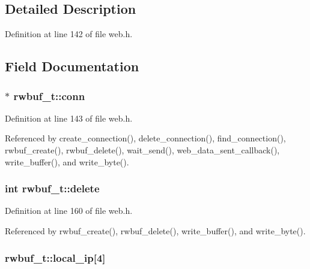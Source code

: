 \subsection{Detailed Description}


Definition at line 142 of file web.\+h.



\subsection{Field Documentation}
\subsubsection[{\texorpdfstring{conn}{conn}}]{$\ast$ rwbuf\+\_\+t\+::conn}\hypertarget{structrwbuf__t_a15785240e32c27f7af7c4b0cb1a6e39b}{}\label{structrwbuf__t_a15785240e32c27f7af7c4b0cb1a6e39b}


Definition at line 143 of file web.\+h.



Referenced by create\+\_\+connection(), delete\+\_\+connection(), find\+\_\+connection(), rwbuf\+\_\+create(), rwbuf\+\_\+delete(), wait\+\_\+send(), web\+\_\+data\+\_\+sent\+\_\+callback(), write\+\_\+buffer(), and write\+\_\+byte().

\subsubsection[{\texorpdfstring{delete}{delete}}]{\setlength{\rightskip}{0pt plus 5cm}int rwbuf\+\_\+t\+::delete}\hypertarget{structrwbuf__t_a54e278f96a331cf0a61d22094c4b9f87}{}\label{structrwbuf__t_a54e278f96a331cf0a61d22094c4b9f87}


Definition at line 160 of file web.\+h.



Referenced by rwbuf\+\_\+create(), rwbuf\+\_\+delete(), write\+\_\+buffer(), and write\+\_\+byte().

\subsubsection[{\texorpdfstring{local\+\_\+ip}{local_ip}}]{ rwbuf\+\_\+t\+::local\+\_\+ip\mbox{[}4\mbox{]}}\hypertarget{structrwbuf__t_aa26b4813db79aeaa293bb1eadfde0b54}{}\label{structrwbuf__t_aa26b4813db79aeaa293bb1eadfde0b54}


